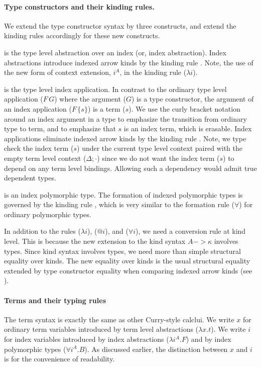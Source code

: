 \paragraph{Type constructors and their kinding rules.}
We extend the type constructor syntax by three constructs,
and extend the kinding rules accordingly for these new constructs.

 is the type level abstraction over an index
(or, index abstraction). Index abstractions introduce indexed arrow kinds
by the kinding rule . Note, the use of the new form of context
extension, $i^A$, in the kinding rule ($\lambda i$).


 is the type level index application. In contrast to
the ordinary type level application ($F\,G$) where the argument ($G$) is
a type constructor, the argument of an index application ($F\,\{s\}$) is
a term ($s$). We use the curly bracket notation around an index argument in a type to
emphasize the transition from ordinary type to term, and to emphasize
that $s$ is an index term, which is erasable. Index applications eliminate
indexed arrow kinds by the kinding rule . Note, we type check
the index term ($s$) under the current type level context paired with
the empty term level context ($\Delta;\cdot$) since we do not want
the index term ($s$) to depend on any term level bindings. Allowing such
a dependency would admit true dependent types.

 is an index polymorphic type.
The formation of indexed polymorphic types is governed by
the kinding rule , which is very similar to
the formation rule ($\forall$) for ordinary polymorphic types.

In addition to the rules ($\lambda i$), ($@ i$), and ($\forall i$),
we need a conversion rule  at kind level. This is because
the new extension to the kind syntax $A -> \kappa$ involves types.
Since kind syntax involves types, we need more than simple structural
equality over kinds. The new equality over kinds is the usual structural equality
extended by type constructor equality when comparing indexed arrow kinds
(see ).

\paragraph{Terms and their typing rules}
The term syntax is exactly the same as other Curry-style calclui.
We write $x$ for ordinary term variables introduced by
term level abstractions ($\lambda x.t$).
We write $i$ for index variables introduced by
index abstractions ($\lambda i^A.F$) and by
index polymorphic types ($\forall i^A.B$). As discussed earlier, the distinction between
$x$ and $i$ is for the convenience of readability.

